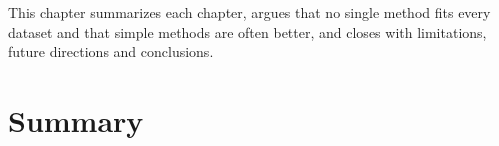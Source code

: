 This chapter summarizes each chapter, argues that no single method fits every dataset and that simple methods are often better, and closes with limitations, future directions and conclusions. %



\section{Summary}
